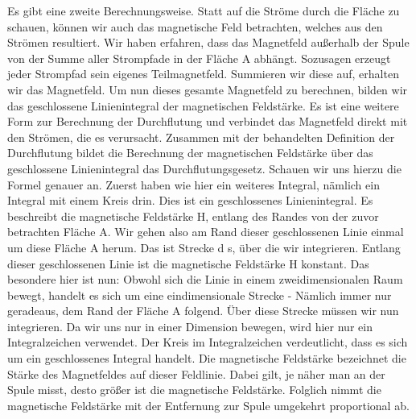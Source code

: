 \begin{frame}
{	Es gibt eine zweite Berechnungsweise. Statt auf die Ströme durch die Fläche zu schauen, können wir auch das magnetische Feld betrachten, welches aus den Strömen resultiert. 
	Wir haben erfahren, dass das Magnetfeld außerhalb der Spule von der Summe aller Strompfade in der Fläche A abhängt. Sozusagen erzeugt jeder Strompfad sein eigenes Teilmagnetfeld. Summieren wir diese auf, erhalten wir das Magnetfeld. Um nun dieses gesamte Magnetfeld zu berechnen, bilden wir das geschlossene Linienintegral der magnetischen Feldstärke. Es ist eine weitere Form zur Berechnung der Durchflutung und verbindet das Magnetfeld direkt mit den Strömen, die es verursacht. Zusammen mit der behandelten Definition der Durchflutung bildet die Berechnung der magnetischen Feldstärke über das geschlossene Linienintegral das Durchflutungsgesetz. 
	Schauen wir uns hierzu die Formel genauer an. Zuerst haben wie hier ein weiteres Integral, nämlich ein Integral mit einem Kreis drin. Dies ist ein geschlossenes Linienintegral. Es beschreibt die magnetische Feldstärke H, entlang des Randes von der zuvor betrachten Fläche A. Wir gehen also am Rand dieser geschlossenen Linie einmal um diese Fläche A herum. Das ist Strecke d s, über die wir integrieren. Entlang dieser geschlossenen Linie ist die magnetische Feldstärke H konstant. Das besondere hier ist nun: Obwohl sich die Linie in einem zweidimensionalen Raum bewegt, handelt es sich um eine eindimensionale Strecke - Nämlich immer nur geradeaus, dem Rand der Fläche A folgend. 
	Über diese Strecke müssen wir nun integrieren. Da wir uns nur in einer Dimension bewegen, wird hier nur ein Integralzeichen verwendet. Der Kreis im Integralzeichen verdeutlicht, dass es sich um ein geschlossenes Integral handelt.
	Die magnetische Feldstärke bezeichnet die Stärke des Magnetfeldes auf dieser Feldlinie. Dabei gilt, je näher man an der Spule misst, desto größer ist die magnetische Feldstärke. Folglich nimmt die magnetische Feldstärke mit der Entfernung zur Spule umgekehrt proportional ab.}
\end{frame}


